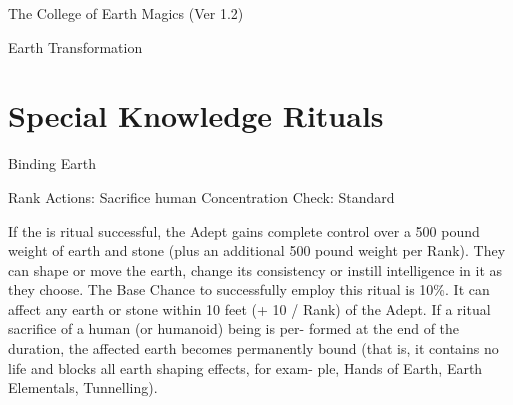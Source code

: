 \begin{Chapter}{The College of Earth Magics (Ver 1.2)}
\begin{spell}[S-19]{Earth Transformation }
\begin{effects}
\end{effects}
\end{spell}

\section{Special Knowledge Rituals}


\begin{ritual}[R-1]{Binding Earth }

Rank 
Actions: Sacrifice human 
Concentration Check: Standard 
\begin{effects}
 If  the  is  ritual  successful,  the  Adept  gains 
complete control over a 500 pound weight of earth 
and stone (plus an additional 500 pound weight per 
Rank).  They  can  shape  or  move  the  earth,  change 
its  consistency  or  instill  intelligence  in  it  as  they 
choose.  The  Base  Chance  to  successfully  employ 
this  ritual  is  10\%.  It  can  affect  any  earth  or  stone 
within 10 feet (+ 10 / Rank) of the Adept. If a ritual 
sacrifice  of  a  human  (or  humanoid)  being  is  per-
formed at the end of the duration, the affected earth 
becomes permanently bound (that is, it contains no 
life and blocks all earth shaping effects, for exam-
ple, Hands of Earth, Earth Elementals, Tunnelling). 

\end{effects}
\end{ritual}

\end{Chapter}

